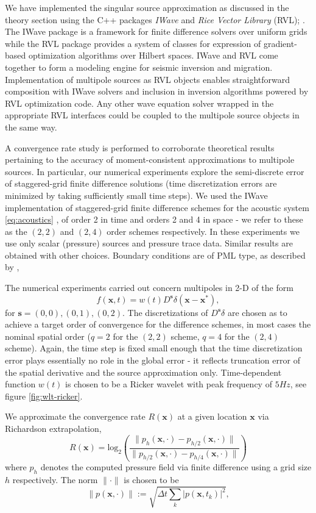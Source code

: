 We have implemented the singular source approximation as discussed in the theory section
using the C++ packages \emph{IWave} and \emph{Rice Vector Library} (RVL);
\citep{GeoPros:11,RVL_TOMS}.  The IWave package %
is a framework for finite difference solvers over uniform grids while
the RVL package provides a system of classes for expression of
gradient-based optimization algorithms over Hilbert spaces.  IWave and
RVL come together to form a modeling engine for seismic inversion and
migration. Implementation of multipole sources as RVL objects enables
straightforward composition with IWave solvers and inclusion in
inversion algorithms powered by RVL optimization code. Any other wave
equation solver wrapped in the appropriate RVL interfaces could be
coupled to the multipole source objects in the same way.

A convergence rate study is performed to corroborate theoretical results
pertaining to the accuracy of moment-consistent approximations to multipole sources.
In particular, our numerical experiments explore the semi-discrete error of staggered-grid finite difference solutions (time discretization errors are 
minimized by taking sufficiently small time steps).
We used the IWave implementation of staggered-grid finite difference schemes 
for the acoustic system \ref{eq:acoustics} \cite[]{Vir:84}, of order 2 in time and orders 2 and 4 in space - we
refer to these as the $(2,2)$ and $(2,4)$ order schemes respectively. In these
experiments we use only scalar (pressure) sources and pressure trace
data. Similar results are obtained with other choices. Boundary
conditions are of PML type, as described by \cite{Habashy:07},

The numerical experiments carried out concern multipoles in 2-D of the form
\[
	f(\mathbf x,t) = w(t) D^{\mathbf s} \delta(\mathbf x-\mathbf x^*),
\]
for $\mathbf s =(0,0),(0,1),(0,2)$.
The discretizations of $D^{\mathbf s}\delta$ are chosen as to achieve a target order of
convergence for the difference schemes, in most cases the nominal
spatial order ($q=2$ for the $(2,2)$ scheme, $q=4$ for the $(2,4)$ scheme). 
Again, the time step is fixed small enough that the time discretization error plays
essentially no role in the global error - it reflects truncation error
of the spatial derivative and the source approximation only.
Time-dependent function $w(t)$ is chosen to be a Ricker wavelet with peak 
frequency of $5Hz$, see figure \ref{fig:wlt-ricker}.

We approximate the convergence rate $R(\mathbf x)$ at a given location $\mathbf x$ via Richardson extrapolation,
\[
        R(\mathbf x) = \text{log}_2 \left( \frac{\| p_{h}(\mathbf x,\cdot)-p_{h/2}(\mathbf x,\cdot)\| }{\|p_{h/2}(\mathbf x,\cdot)-p_{h/4}(\mathbf x,\cdot)\| } \right)
\] 
where $p_h$ denotes the computed pressure field via finite difference using a grid size $h$ respectively.
The norm $\|\cdot\|$ is chosen to be 
\[
        \|p(\mathbf x,\cdot) \| := \sqrt{ \Delta t \sum_{k} |p(\mathbf x,t_k)|^2},
\]

